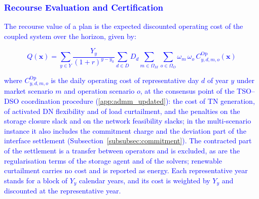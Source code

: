 \subsubsection{\textcolor{blue}{Recourse Evaluation and Certification}}
\label{subsubsec:certification}

\textcolor{blue}{
    The recourse value of a plan is the expected discounted operating cost of the coupled system over the horizon, given by:
}

\textcolor{blue}{
    \begin{equation}
        Q(\boldsymbol{x}) =
        \sum_{y \in Y} \frac{Y_y}{(1+r)^{y-y_0}}
        \sum_{d \in D} D_d
        \sum_{m \in \Omega_M} \sum_{o \in \Omega_O} \omega_m \, \omega_o \,
        C^{\text{Op}}_{y,d,m,o}(\boldsymbol{x})
        \label{eq:recourse_value}
    \end{equation}
}

\noindent
\textcolor{blue}{
    where $C^{\text{Op}}_{y,d,m,o}$ is the daily operating cost of representative day $d$ of year $y$ under market scenario $m$ and operation scenario $o$, at the consensus point of the TSO--DSO coordination procedure (\ref{app:admm_updated}): the cost of TN generation, of activated DN flexibility and of load curtailment, and the penalties on the storage closure slack and on the network feasibility slacks; in the multi-scenario instance it also includes the commitment charge and the deviation part of the interface settlement (Subsection~\ref{subsubsec:commitment}).
    The contracted part of the settlement is a transfer between operators and is excluded, as are the regularisation terms of the storage agent and of the solvers; renewable curtailment carries no cost and is reported as energy.
    Each representative year stands for a block of $Y_y$ calendar years, and its cost is weighted by $Y_y$ and discounted at the representative year.
}

